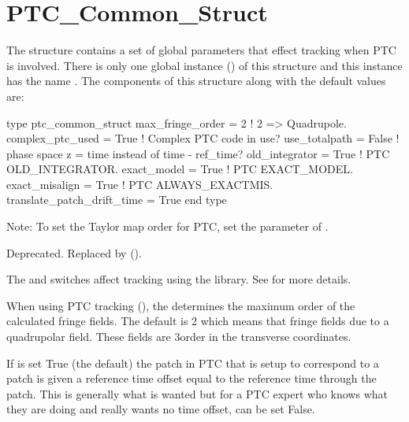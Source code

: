 {%
\section{PTC_Common_Struct}
\label{s:ptc.common}

The  structure contains a set of global parameters that effect tracking when
PTC is involved. There is only one global instance () of this structure and
this instance has the name . The components of this structure along with the default
values are:
\begin{example}
  type ptc_common_struct
    max_fringe_order  = 2   ! 2 => Quadrupole.
    complex_ptc_used = True ! Complex PTC code in use? 
    use_totalpath  = False  ! phase space z = time instead of time - ref_time?
    old_integrator = True   ! PTC OLD_INTEGRATOR.
    exact_model    = True   ! PTC EXACT_MODEL.
    exact_misalign = True   ! PTC ALWAYS_EXACTMIS.
    translate_patch_drift_time = True  
  end type
\end{example}

Note: To set the Taylor map order for PTC, set the  parameter of .

\begin{description}
%
  \item[{parameter[ptc_exact_model]}] \Newline
Deprecated. Replaced by  ().

The  and  switches affect tracking using the 
library. See  for more details.
%
  \item[{ptc_com[max_fringe_order]}] \Newline
When using PTC tracking (), the  determines
the maximum order of the calculated fringe fields. The default is 2 which means that fringe fields
due to a quadrupolar field. These fields are 3\Rd order in the transverse coordinates.
%
  \item[{ptc_com[translate_patch_drift_time]}] \Newline
If  is set True (the default) the patch in PTC that is setup to
correspond to a \bmad patch is given a reference time offset equal to the \bmad reference time
through the patch. This is generally what is wanted but for a PTC expert who knows what they are
doing and really wants no time offset,  can be set False.
  \end{description}

}
